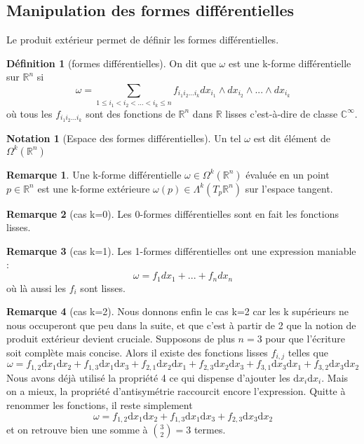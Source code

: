 \documentclass{article}
\newcommand{\C}{\mathbb{C}} %
\newcommand{\R}{\mathbb{R}} %
\theoremstyle{definition} %
\newtheorem{defi}{Définition}
\newtheorem{rmq}{Remarque}
\newtheorem{nota}{Notation}
\newcommand{\OM}[1]{\Omega^{#1} (\R^n)}
\newcommand{\dd}{ \mathrm{d}}
\newcommand{\1}{\mathbb{1}} %
\begin{document}
\subsection{Manipulation des formes différentielles}
Le produit extérieur permet de définir les formes différentielles.
\begin{defi}[formes différentielles]
On dit que $\omega$ est une k-forme différentielle sur $\R^n$ si
$$\omega = \sum_{1\leq i_1 < i_2 < ... <i_k \leq n} f_{i_1 i_2 ... i_k} dx_{i_1} \wedge dx_{i_2} \wedge ... \wedge dx_{i_k}$$
où tous les $f_{i_1 i_2 ... i_k}$ sont des fonctions de $\R^n $ dans $ \R$ lisses c'est-à-dire de classe $\C^\infty$.
\end{defi}
\begin{nota}[Espace des formes différentielles]
Un tel $\omega$ est dit élément de $\Omega^k(\R^n)$
\end{nota}
\begin{rmq}
Une k-forme différentielle $\omega \in \OM{k}$ évaluée en un point $p \in \R^n$ est une k-forme extérieure $\omega(p) \in \Lambda^k(T_p\R^n)$ sur l'espace tangent.
\end{rmq}

\begin{rmq}[cas k=0]
Les 0-formes différentielles sont en fait les fonctions lisses.
\end{rmq}
\begin{rmq}[cas k=1]
Les 1-formes différentielles ont une expression maniable : 
$$\omega = f_1 dx_1 + ... + f_ndx_n$$
où là aussi les $f_i$ sont lisses.
\end{rmq}
\begin{rmq}[cas k=2]
Nous donnons enfin le cas k=2 car les k supérieurs ne nous occuperont que peu dans la suite, et que c'est à partir de 2 que la notion de produit extérieur devient cruciale.
Supposons de plus $n=3$ pour que l'écriture soit complète mais concise. Alors il existe des fonctions lisses $f_{i,j}$ telles que
$$\omega = f_{1,2} \dd x_1 \dd x_2 + f_{1,3} \dd x_1 \dd x_3 + f_{2,1} \dd x_2 \dd x_1 + f_{2,3} \dd x_2 \dd x_3 + f_{3,1} \dd x_3 \dd x_1 + f_{3,2} \dd x_3 \dd x_2$$
Nous avons déjà utilisé la propriété 4 ce qui dispense d'ajouter les $\dd x_i \dd x_i$.
Mais on a mieux, la propriété d'antisymétrie raccourcit encore l'expression.
Quitte à renommer les fonctions, il reste simplement
$$\omega = f_{1,2} \dd x_1 \dd x_2 + f_{1,3} \dd x_1 \dd x_3 + f_{2,3} \dd x_3 \dd x_2  $$
et on retrouve bien une somme à $\binom{3}{2}=3$ termes.


\end{rmq}
\end{document}
